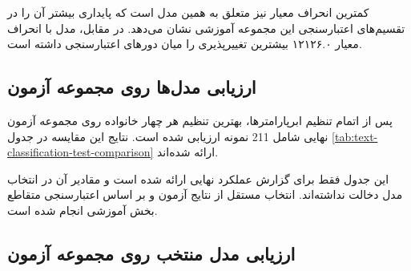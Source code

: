 \documentclass[12pt,a4paper,oneside]{report}
\begin{document}
کمترین انحراف معیار نیز متعلق به همین مدل است که پایداری بیشتر آن را در تقسیم‌های اعتبارسنجی این مجموعه آموزشی نشان می‌دهد. در مقابل، مدل
با انحراف معیار ۱۲۱۲۶.۰ بیشترین تغییرپذیری را میان دورهای اعتبارسنجی داشته است.


\subsection{ارزیابی مدل‌ها روی مجموعه آزمون}

پس از اتمام تنظیم ابرپارامترها، بهترین تنظیم هر چهار خانواده روی مجموعه آزمون نهایی شامل 211 نمونه ارزیابی شده است. نتایج این مقایسه در جدول
\ref{tab:text-classification-test-comparison}
ارائه شده‌اند.

\begin{table}[H]
\centering
\caption{مقایسه عملکرد طبقه‌بندهای متن روی مجموعه آزمون نهایی}
\label{tab:text-classification-test-comparison}
\small
{}
\end{table}

این جدول فقط برای گزارش عملکرد نهایی ارائه شده است و مقادیر آن در انتخاب مدل دخالت نداشته‌اند. انتخاب
مستقل از نتایج آزمون و بر اساس اعتبارسنجی متقاطع بخش آموزشی انجام شده است.


\subsection{ارزیابی مدل منتخب روی مجموعه آزمون}
\end{document}
